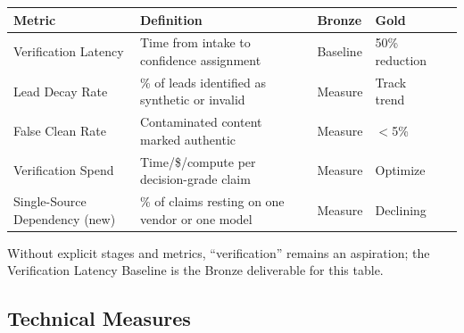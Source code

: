 \documentclass[11pt,letterpaper]{article}
\begin{document}
\begin{keybox}
\begin{center}
\small
\begin{tabularx}{\linewidth}{ZY{1.03}Y{1.48}Y{0.71}Y{0.78}}
\toprule
\textbf{Metric} & \textbf{Definition} & \textbf{Bronze} & \textbf{Gold} \\
\midrule
Verification Latency & Time from intake to confidence assignment & Baseline & 50\% reduction \\
Lead Decay Rate & \% of leads identified as synthetic or invalid & Measure & Track trend \\
False Clean Rate & Contaminated content marked authentic & Measure & $<$5\% \\
Verification Spend & Time/\$/compute per decision-grade claim & Measure & Optimize \\
Single-Source Dependency (new) & \% of claims resting on one vendor or one model & Measure & Declining \\
\bottomrule
\end{tabularx}
\end{center}
Without explicit stages and metrics, ``verification'' remains an aspiration; the Verification Latency Baseline is the Bronze deliverable for this table.
\end{keybox}

\subsection{Technical Measures}
\end{document}
